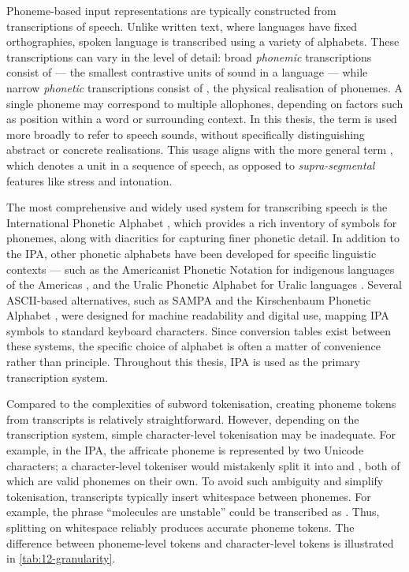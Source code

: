 Phoneme-based input representations are typically constructed from transcriptions of speech. Unlike written text, where languages have fixed orthographies, spoken language is transcribed using a variety of alphabets. These transcriptions can vary in the level of detail: broad \emph{phonemic} transcriptions consist of  --- the smallest contrastive units of sound in a language --- while narrow \emph{phonetic} transcriptions consist of , the physical realisation of phonemes. A single phoneme may correspond to multiple allophones, depending on factors such as position within a word or surrounding context. In this thesis, the term  is used more broadly to refer to speech sounds, without specifically distinguishing abstract or concrete realisations. This usage aligns with the more general term , which denotes a unit in a sequence of speech, as opposed to \emph{supra-segmental} features like stress and intonation. 

The most comprehensive and widely used system for transcribing speech is the International Phonetic Alphabet \citep[IPA][]{international1999handbook}, which provides a rich inventory of symbols for phonemes, along with diacritics for capturing finer phonetic detail. In addition to the IPA, other phonetic alphabets have been developed for specific linguistic contexts --- such as the Americanist Phonetic Notation for indigenous languages of the Americas \citep{lehmann2013historical}, and the Uralic Phonetic Alphabet for Uralic languages \citep{abondolo1998uralic}. Several ASCII-based alternatives, such as SAMPA \citep{wells1992standard} and the Kirschenbaum Phonetic Alphabet \citep{kirshenbaum2011ascii}, were designed for machine readability and digital use, mapping IPA symbols to standard keyboard characters. Since conversion tables exist between these systems, the specific choice of alphabet is often a matter of convenience rather than principle. Throughout this thesis, IPA is used as the primary transcription system.

Compared to the complexities of subword tokenisation, creating phoneme tokens from transcripts is relatively straightforward. However, depending on the transcription system, simple character-level tokenisation may be inadequate. For example, in the IPA, the affricate phoneme  is represented by two Unicode characters; a character-level tokeniser would mistakenly split it into  and , both of which are valid phonemes on their own. To avoid such ambiguity and simplify tokenisation, transcripts typically insert whitespace between phonemes. For example, the phrase ``molecules are unstable'' could be transcribed as . Thus, splitting on whitespace reliably produces accurate phoneme tokens. The difference between phoneme-level tokens and character-level tokens is illustrated in \cref{tab:12-granularity}.

